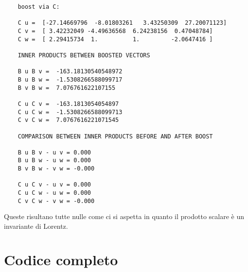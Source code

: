 \documentclass[12pt]{report}
\begin{document}
\begin{verbatim}
	boost via C:
	
	C u =  [-27.14669796  -8.01803261   3.43250309  27.20071123]
	C v =  [ 3.42232049 -4.49636568  6.24238156  0.47048784]
	C w =  [ 2.29415734  1.          1.         -2.0647416 ]
	
	INNER PRODUCTS BETWEEN BOOSTED VECTORS
	
	B u B v =  -163.18130540548972
	B u B w =  -1.5308266588099717
	B v B w =  7.076761622107155
	
	C u C v =  -163.1813054054897
	C u C w =  -1.5308266588099713
	C v C w =  7.0767616221071545
	
	COMPARISON BETWEEN INNER PRODUCTS BEFORE AND AFTER BOOST
	
	B u B v - u v = 0.000
	B u B w - u w = 0.000
	B v B w - v w = -0.000
	
	C u C v - u v = 0.000
	C u C w - u w = 0.000
	C v C w - v w = -0.000
\end{verbatim}

Queste risultano tutte nulle come ci si aspetta in quanto il prodotto scalare è un invariante di Lorentz.


\section*{Codice completo}
\end{document}
